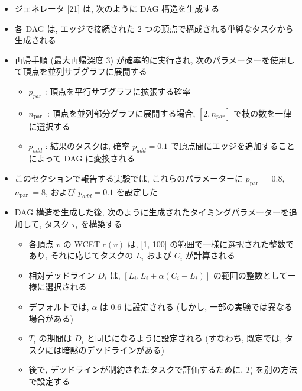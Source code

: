 \begin{frame}{}
    \begin{itemize}
        \item ジェネレータ [21] は, 次のように DAG 構造を生成する
\item 各 DAG は, エッジで接続された 2 つの頂点で構成される単純なタスクから生成される
\item 再帰手順 (最大再帰深度 3) が確率的に実行され, 次のパラメーターを使用して頂点を並列サブグラフに展開する
              \begin{itemize}
                  \item  $p_{p a r}$ : 頂点を平行サブグラフに拡張する確率

                  \item  $n_{\text {par }}$ : 頂点を並列部分グラフに展開する場合, $\left[2, n_{p a r}\right]$ で枝の数を一律に選択する

                  \item  $p_{a d d}$ : 結果のタスクは, 確率 $p_{a d d}=0.1$ で頂点間にエッジを追加することによって DAG に変換される

              \end{itemize}
    \end{itemize}
\end{frame}

\begin{frame}{}
    \begin{itemize}
        \item このセクションで報告する実験では, これらのパラメーターに $p_{\text {par }}=0.8$, $n_{\text {par }}=8$, および $p_{a d d}=0.1$ を設定した
    \end{itemize}
\end{frame}

\begin{frame}{}
    \begin{itemize}
        \item DAG 構造を生成した後, 次のように生成されたタイミングパラメーターを追加して, タスク $\tau_{i}$ を構築する

              \begin{itemize}
                  \item  各頂点 $v$ の WCET $c(v)$ は, [1, 100] の範囲で一様に選択された整数であり, それに応じてタスクの $L_{i}$ および $C_{i}$ が計算される

                  \item  相対デッドライン $D_{i}$ は, $\left[L_{i}, L_{i}+\alpha\left(C_{i}-L_{i}\right)\right]$ の範囲の整数として一様に選択される
\item デフォルトでは, $\alpha$ は $0.6$ に設定される (しかし, 一部の実験では異なる場合がある)
\item $T_{i}$ の期間は $D_{i}$ と同じになるように設定される (すなわち, 既定では, タスクには暗黙のデッドラインがある)
\item 後で, デッドラインが制約されたタスクで評価するために, $T_{i}$ を別の方法で設定する

              \end{itemize}
    \end{itemize}
\end{frame}

